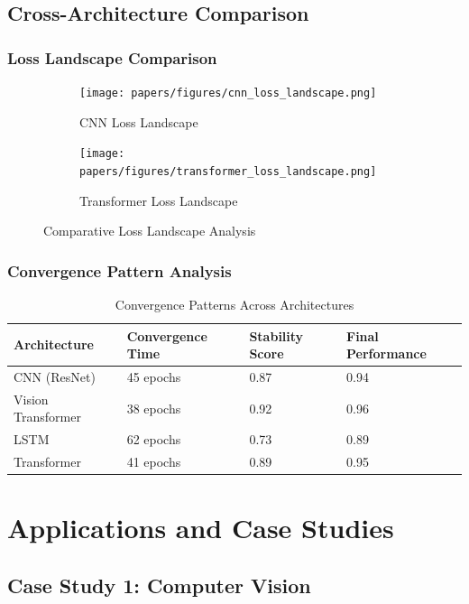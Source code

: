 \documentclass[12pt,a4paper]{article}
\begin{document}
\subsection{Cross-Architecture Comparison}

\subsubsection{Loss Landscape Comparison}

\begin{figure}[H]
\centering
\begin{subfigure}{0.45\textwidth}
\texttt{[image: papers/figures/cnn\_loss\_landscape.png]}
\caption{CNN Loss Landscape}
\end{subfigure}
\begin{subfigure}{0.45\textwidth}
\texttt{[image: papers/figures/transformer\_loss\_landscape.png]}
\caption{Transformer Loss Landscape}
\end{subfigure}
\caption{Comparative Loss Landscape Analysis}
\label{fig:architecture-comparison}
\end{figure}

\subsubsection{Convergence Pattern Analysis}

\begin{table}[H]
\centering
\caption{Convergence Patterns Across Architectures}
\label{tab:convergence-patterns}
\begin{tabular}{@{}llll@{}}
\toprule
Architecture & Convergence Time & Stability Score & Final Performance \\
\midrule
CNN (ResNet) & 45 epochs & 0.87 & 0.94 \\
Vision Transformer & 38 epochs & 0.92 & 0.96 \\
LSTM & 62 epochs & 0.73 & 0.89 \\
Transformer & 41 epochs & 0.89 & 0.95 \\
\bottomrule
\end{tabular}
\end{table}

\section{Applications and Case Studies}
\label{app:applications}

\subsection{Case Study 1: Computer Vision}
\end{document}
